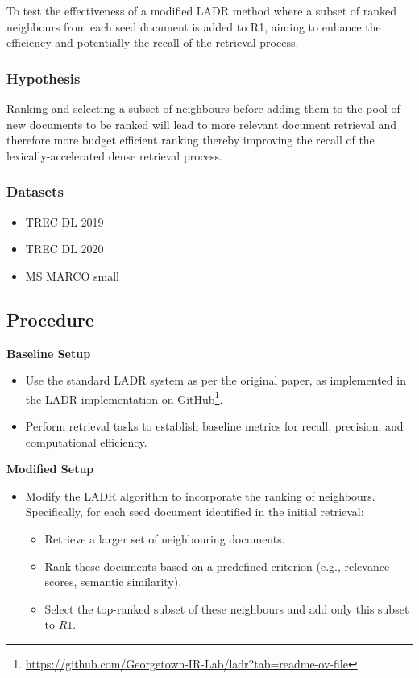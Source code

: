 \documentclass[sigconf,authorversion,nonacm]{acmart}
\begin{document}
To test the effectiveness of a modified LADR method where a subset of ranked neighbours from each
seed document is added to R1, aiming to enhance the efficiency and potentially the recall of the
retrieval process.

\subsubsection{Hypothesis}

Ranking and selecting a subset of neighbours before adding them to the pool of new documents to be
ranked will lead to more relevant document retrieval and therefore more budget efficient ranking
thereby improving the recall of the lexically-accelerated dense retrieval process.

\subsubsection{Datasets}

\begin{itemize}
	\item TREC DL 2019
	\item TREC DL 2020
	\item MS MARCO small
\end{itemize}

\subsection{Procedure}

\textbf{Baseline Setup}
\begin{itemize}
	\item Use the standard LADR system as per the original paper, as implemented in the LADR implementation on GitHub\footnote{\url{https://github.com/Georgetown-IR-Lab/ladr?tab=readme-ov-file}}.
	\item Perform retrieval tasks to establish baseline metrics for recall, precision, and computational efficiency.
\end{itemize}

\textbf{Modified Setup}
\begin{itemize}
	\item Modify the LADR algorithm to incorporate the ranking of neighbours. Specifically, for each seed document identified in the initial retrieval:
	      \begin{itemize}
		      \item Retrieve a larger set of neighbouring documents.
		      \item Rank these documents based on a predefined criterion (e.g., relevance scores, semantic similarity).
		      \item Select the top-ranked subset of these neighbours and add only this subset to \( R1 \).
	      \end{itemize}
\end{itemize}
\end{document}

